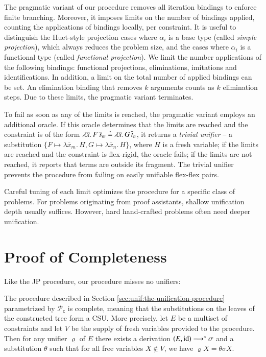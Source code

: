 The pragmatic variant of our procedure removes all iteration bindings to enforce finite branching. 
Moreover, it
imposes limits 
on the number of bindings applied,
counting the applications of bindings locally, per
constraint. 
It is useful to distinguish the Huet-style projection cases where
$\alpha_i$ is a base type (called \emph{simple projection}), which always
reduces the problem size, and the cases where $\alpha_i$ is a functional type (called \emph{functional
projection}). We limit the number applications of the following bindings:
functional projections, eliminations, imitations and identifications.
In addition,
a limit on the total number of applied bindings can be set. 
An elimination binding that removes $k$ arguments counts as $k$
elimination steps.
Due to these limits, the pragmatic variant 
terminates.

To fail as soon as any of the limits
is reached, the pragmatic variant employs an additional oracle.
If this oracle determines that the limits are reached and the constraint is of the form
$\lambda \overline{x}.\, F \, \overline{s}_m \unif \lambda \overline{x}.\, G \, \overline{t}_n$, it returns a \emph{trivial unifier} --
a substitution $\{ F \mapsto \lambda \overline{x}_m.\, H, G \mapsto \lambda \overline{x}_n.\, H \}$, where $H$ is a fresh variable; if the limits are reached and
the constraint is flex-rigid, the oracle fails; if the limits are not reached, 
it reports that terms are outside its fragment. The trivial unifier prevents the procedure from failing on
easily unifiable flex-flex pairs.

Careful tuning of each limit optimizes the procedure for a specific class of problems. 
For problems originating from proof assistants, shallow unification depth usually suffices. However, hard
hand-crafted problems often need
deeper unification.




\section{Proof of Completeness}
\label{sec:unif:proof-of-completeness}

Like the JP procedure, our procedure misses no unifiers:

\begin{theorem}
\label{thm:completeness}
The procedure described in Section \ref{sec:unif:the-unification-procedure}
parametrized by $\mathcal{P}_\mathsf{c}$ is complete, meaning that the
substitutions on the leaves of the constructed tree form a CSU.
More precisely, let $E$ be a multiset of constraints
and let $V$ be the supply of fresh variables provided to the procedure. 
Then for any unifier $\varrho$ of $E$ there exists
a derivation $\left(E,\makeop{id}\right)\longrightarrow^{*}\sigma$ and a
substitution $\theta$ such that for all free variables $X\not\in V$, we have $\varrho X = \theta\sigma X$.
\end{theorem}

